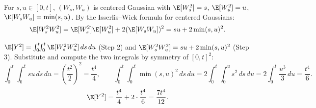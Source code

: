 \begin{parts}
\begin{xsolution}
For $s,u\in[0,t]$, $(W_s,W_u)$ is centered Gaussian with $\E[W_s^2]=s$, $\E[W_u^2]=u$, $\E[W_sW_u]=\min(s,u)$.
By the Isserlis--Wick formula for centered Gaussians:
\[
\E[W_s^2W_u^2]=\E[W_s^2]\E[W_u^2]+2(\E[W_sW_u])^2=su+2\min(s,u)^2.
\]

$\E[Y^2]=\int_0^t\!\!\int_0^t \E[W_s^2W_u^2]\,ds\,du$ (Step 2) and $\E[W_s^2W_u^2]=su+2\min(s,u)^2$ (Step 3).
Substitute and compute the two integrals by symmetry of $[0,t]^2$:
\[
\int_0^t\!\!\int_0^t su\,ds\,du=\left(\frac{t^2}{2}\right)^2=\frac{t^4}{4},
\qquad
\int_0^t\!\!\int_0^t \min(s,u)^2\,ds\,du
=2\int_0^t\!\int_0^u s^2\,ds\,du
=2\int_0^t \frac{u^3}{3}\,du=\frac{t^4}{6}.
\]
\[
\E[Y^2]=\frac{t^4}{4}+2\cdot\frac{t^4}{6}=\frac{7t^4}{12}.
\]
    \end{xsolution}
    \end{parts}